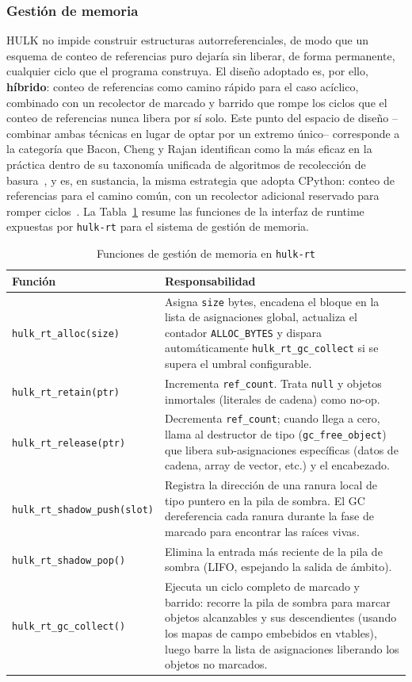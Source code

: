 \documentclass[12pt, a4paper]{article}
\begin{document}
\subsubsection{Gestión de memoria}

HULK no impide construir estructuras autorreferenciales, de modo que un
esquema de conteo de referencias puro dejaría sin liberar, de forma permanente,
cualquier ciclo que el programa construya. El diseño adoptado es, por ello,
\textbf{híbrido}: conteo de referencias como camino rápido para el caso
acíclico, combinado con un recolector de marcado y barrido que rompe los
ciclos que el conteo de referencias nunca libera por sí solo. Este punto del
espacio de diseño --combinar ambas técnicas en lugar de optar por un extremo
único-- corresponde a la categoría que Bacon, Cheng y Rajan identifican como la
más eficaz en la práctica dentro de su taxonomía unificada de algoritmos de
recolección de basura~\cite{baconrajan2004}, y es, en sustancia, la misma
estrategia que adopta CPython: conteo de referencias para el camino común, con
un recolector adicional reservado para romper ciclos~\cite{baconrajan2001}.
La Tabla~\ref{tab:gc-functions} resume las funciones de la interfaz de runtime 
expuestas por \texttt{hulk-rt} para el sistema de gestión de memoria.

\begin{table}[h!]
\centering
\caption{Funciones de gestión de memoria en \texttt{hulk-rt}}
\label{tab:gc-functions}
\begin{tabularx}{\textwidth}{@{}lX@{}}
\toprule
\textbf{Función} & \textbf{Responsabilidad} \\
\midrule
\texttt{hulk\_rt\_alloc(size)} & Asigna \texttt{size} bytes, encadena el bloque en la lista de asignaciones global, actualiza el contador \texttt{ALLOC\_BYTES} y dispara automáticamente \texttt{hulk\_rt\_gc\_collect} si se supera el umbral configurable. \\
\texttt{hulk\_rt\_retain(ptr)} & Incrementa \texttt{ref\_count}. Trata \texttt{null} y objetos inmortales (literales de cadena) como no-op. \\
\texttt{hulk\_rt\_release(ptr)} & Decrementa \texttt{ref\_count}; cuando llega a cero, llama al destructor de tipo (\texttt{gc\_free\_object}) que libera sub-asignaciones específicas (datos de cadena, array de vector, etc.) y el encabezado. \\
\texttt{hulk\_rt\_shadow\_push(slot)} & Registra la dirección de una ranura local de tipo puntero en la pila de sombra. El GC dereferencia cada ranura durante la fase de marcado para encontrar las raíces vivas. \\
\texttt{hulk\_rt\_shadow\_pop()} & Elimina la entrada más reciente de la pila de sombra (LIFO, espejando la salida de ámbito). \\
\texttt{hulk\_rt\_gc\_collect()} & Ejecuta un ciclo completo de marcado y barrido: recorre la pila de sombra para marcar objetos alcanzables y sus descendientes (usando los mapas de campo embebidos en vtables), luego barre la lista de asignaciones liberando los objetos no marcados. \\
\bottomrule
\end{tabularx}
\end{table}
\end{document}
